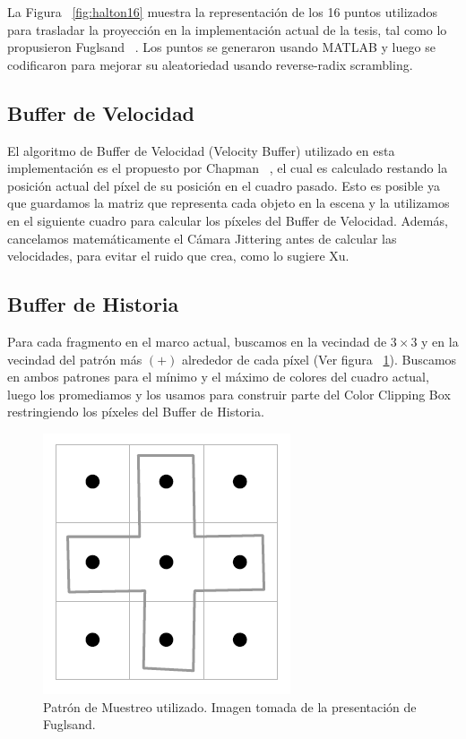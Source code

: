 \documentclass[pregrado]{tesis-usb} %
\begin{document}
La Figura ~\ref{fig:halton16} muestra la representación de los 16 puntos utilizados para trasladar la proyección en la implementación actual de la tesis, tal como lo propusieron Fuglsand ~\cite{Fuglsand2016}. Los puntos se generaron usando MATLAB y luego se codificaron para mejorar su aleatoriedad usando reverse-radix scrambling.

\subsection{Buffer de Velocidad}
El algoritmo de Buffer de Velocidad (Velocity Buffer) utilizado en esta implementación es el propuesto por Chapman ~\cite{Chapman2012}, el cual es calculado restando la posición actual del píxel de su posición en el cuadro pasado. Esto es posible ya que guardamos la matriz que representa cada objeto en la escena y la utilizamos en el siguiente cuadro para calcular los píxeles del Buffer de Velocidad. Además, cancelamos matemáticamente el Cámara Jittering antes de calcular las velocidades, para evitar el ruido que crea, como lo sugiere Xu. ~\cite{XU2016}


\subsection{Buffer de Historia}
Para cada fragmento en el marco actual, buscamos en la vecindad de $3\times 3$ y en la vecindad del patrón más $(+)$ alrededor de cada píxel (Ver figura ~\ref{fig:samplingpattern}). Buscamos en ambos patrones para el mínimo y el máximo de colores del cuadro actual, luego los promediamos y los usamos para construir parte del Color Clipping Box restringiendo los píxeles del Buffer de Historia. ~\cite{Fuglsand2016}
\begin{figure}[!hbt]
	\centering
	\includegraphics[scale=0.8]{images/sampling_pattern.png}
	\caption{Patrón de Muestreo utilizado. Imagen tomada de la presentación de Fuglsand. \protect\cite{Fuglsand2016}}\label{fig:samplingpattern}
\end{figure}
\end{document}
